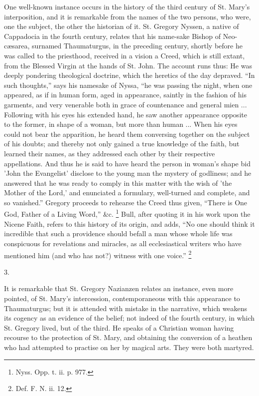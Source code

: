 One well-known instance occurs in the history of the third century
of St. Mary's interposition, and it is remarkable from the names of
the two persons, who were, one the subject, the other the historian of
it. St. Gregory Nyssen, a native of Cappadocia in the fourth century,
relates that his name-sake Bishop of Neo-cæsarea, surnamed
Thaumaturgus, in the preceding century, shortly before he was called
to the priesthood, received in a vision a Creed, which is still
extant, from the Blessed Virgin at the hands of St. John. The account
runs thus: He was deeply pondering theological doctrine, which the
heretics of the day depraved. ``In such thoughts,'' says his
namesake of Nyssa, ``he was passing the night, when one appeared,
as if in human form, aged in appearance, saintly in the fashion of his
garments, and very venerable both in grace of countenance and general
mien ... Following with his eyes his extended hand, he saw another
appearance opposite to the former, in shape of a woman, but more than
human ... When his eyes could not bear the apparition, he heard them
conversing together on the subject of his doubts; and thereby not only
gained a true knowledge of the faith, but learned their names, as they
addressed each other by their respective appellations. And thus he is
said to have heard the person in woman's shape bid 'John the
Evangelist' disclose to the young man the mystery of godliness; and he
answered that he was ready to comply in this matter with the wish of
'the Mother of the Lord,' and enunciated a formulary, well-turned and
complete, and so vanished.'' Gregory proceeds to rehearse the
Creed thus given, ``There is One God, Father of a Living
Word,'' \&c. \footnote{Nyss. Opp. t. ii. p. 977.}
Bull, after quoting it in his work upon the Nicene Faith, refers to
this history of its origin, and adds, ``No one should think it
incredible that such a providence should befall a man whose whole life
was conspicuous for revelations and miracles, as all ecclesiastical
writers who have mentioned him (and who has not?) witness with one
voice.'' \footnote{Def. F. N. ii. 12.}

3.

It is remarkable that St. Gregory Nazianzen relates an instance,
even more pointed, of St. Mary's intercession, contemporaneous with
this appearance to Thaumaturgus; but it is attended with mistake in
the narrative, which weakens its cogency as an evidence of the belief;
not indeed of the fourth century, in which St. Gregory lived, but of
the third. He speaks of a Christian woman having recourse to the
protection of St. Mary, and obtaining the conversion of a heathen who
had attempted to practise on her by magical arts. They were both
martyred.

